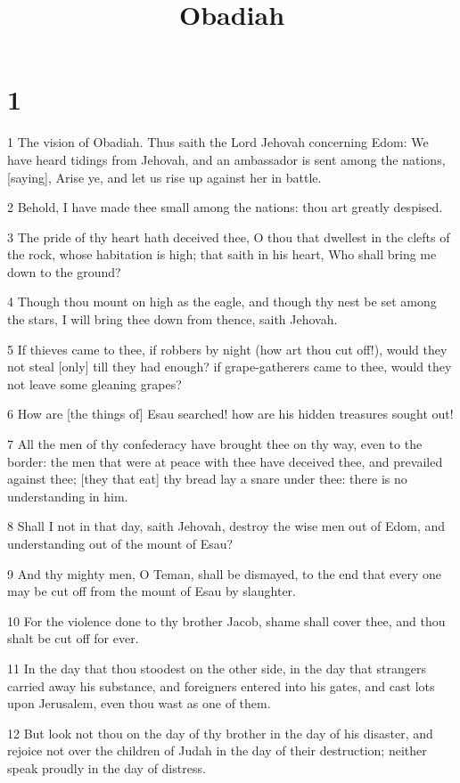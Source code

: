 

\title{Obadiah}

\chapter{1}

\par 1 The vision of Obadiah. Thus saith the Lord Jehovah concerning Edom: We have heard tidings from Jehovah, and an ambassador is sent among the nations, [saying], Arise ye, and let us rise up against her in battle.
\par 2 Behold, I have made thee small among the nations: thou art greatly despised.
\par 3 The pride of thy heart hath deceived thee, O thou that dwellest in the clefts of the rock, whose habitation is high; that saith in his heart, Who shall bring me down to the ground?
\par 4 Though thou mount on high as the eagle, and though thy nest be set among the stars, I will bring thee down from thence, saith Jehovah.
\par 5 If thieves came to thee, if robbers by night (how art thou cut off!), would they not steal [only] till they had enough? if grape-gatherers came to thee, would they not leave some gleaning grapes?
\par 6 How are [the things of] Esau searched! how are his hidden treasures sought out!
\par 7 All the men of thy confederacy have brought thee on thy way, even to the border: the men that were at peace with thee have deceived thee, and prevailed against thee; [they that eat] thy bread lay a snare under thee: there is no understanding in him.
\par 8 Shall I not in that day, saith Jehovah, destroy the wise men out of Edom, and understanding out of the mount of Esau?
\par 9 And thy mighty men, O Teman, shall be dismayed, to the end that every one may be cut off from the mount of Esau by slaughter.
\par 10 For the violence done to thy brother Jacob, shame shall cover thee, and thou shalt be cut off for ever.
\par 11 In the day that thou stoodest on the other side, in the day that strangers carried away his substance, and foreigners entered into his gates, and cast lots upon Jerusalem, even thou wast as one of them.
\par 12 But look not thou on the day of thy brother in the day of his disaster, and rejoice not over the children of Judah in the day of their destruction; neither speak proudly in the day of distress.
